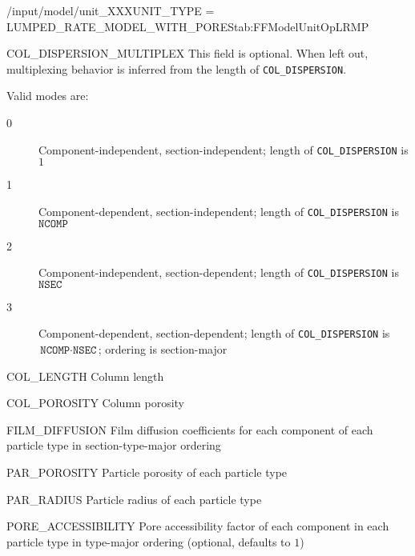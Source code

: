 \begin{condsubgroup}{/input/model/unit\_XXX}{UNIT\_TYPE = LUMPED\_RATE\_MODEL\_WITH\_PORES}{tab:FFModelUnitOpLRMP}
\begin{dataset}[unit=--,type=int,range={$\{0, \dots, 3 \}$},length={1}]{COL\_DISPERSION\_MULTIPLEX}
    This field is optional.
    When left out, multiplexing behavior is inferred from the length of \texttt{COL\_DISPERSION}.

    Valid modes are:
    \begin{description}
      \item[0] Component-independent, section-independent; length of \texttt{COL\_DISPERSION} is $1$
      \item[1] Component-dependent, section-independent; length of \texttt{COL\_DISPERSION} is $\texttt{NCOMP}$
      \item[2] Component-independent, section-dependent; length of \texttt{COL\_DISPERSION} is $\texttt{NSEC}$
      \item[3] Component-dependent, section-dependent; length of \texttt{COL\_DISPERSION} is $\texttt{NCOMP} \cdot \texttt{NSEC}$; ordering is section-major
    \end{description}\vspace{-\baselineskip}
  \end{dataset}
  \begin{dataset}[unit=\si{\metre},type=double,range={$> 0$},length={1}]{COL\_LENGTH}
    Column length
  \end{dataset}
  \begin{dataset}[unit=--,type=double,range={$[0,1]$},length={1}]{COL\_POROSITY}
    Column porosity
  \end{dataset}
  \begin{dataset}[unit=\si{\metre\per\second},type=double,range={$\geq 0$},length={$\texttt{NPARTYPE} \cdot \texttt{NCOMP}$ / $\texttt{NPARTYPE} \cdot \texttt{NCOMP} \cdot \texttt{NSEC}$}]{FILM\_DIFFUSION}
    Film diffusion coefficients for each component of each particle type in section-type-major ordering
  \end{dataset}
  \begin{dataset}[unit=--,type=double,range={$[0,1]$},length={\texttt{NPARTYPE}}]{PAR\_POROSITY}
    Particle porosity of each particle type
  \end{dataset}
  \begin{dataset}[unit=\si{\metre},type=double,range={$>0$},length={\texttt{NPARTYPE}}]{PAR\_RADIUS}
    Particle radius of each particle type
  \end{dataset}
  \begin{dataset}[unit=--,type=double,range={$(0, 1]$},length={$\texttt{NPARTYPE} \cdot \texttt{NCOMP}$}]{PORE\_ACCESSIBILITY}
    Pore accessibility factor of each component in each particle type in type-major ordering (optional, defaults to $1$)

\end{dataset}
\end{condsubgroup}
